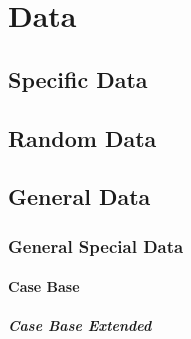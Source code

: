 \section{Data}

\lipsum[4]

\subsection{Specific Data}

\lipsum[5]

\subsection{Random Data}

\lipsum[7]

\subsection{General Data}

\lipsum[6]

\subsubsection{General Special Data}

\lipsum[8]

\paragraph{Case Base}
\lipsum[9]
\subparagraph{Case Base Extended}
\lipsum[10]

